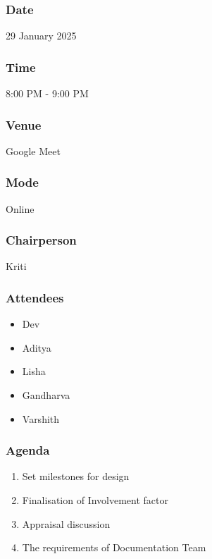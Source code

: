 \documentclass[12pt,a4paper]{article}
\begin{document}
\subsubsection*{Date}
29 January 2025

\subsubsection*{Time}
8:00 PM - 9:00 PM

\subsubsection*{Venue}
Google Meet

\subsubsection*{Mode}
Online

\subsubsection*{Chairperson}
Kriti

\subsubsection*{Attendees}
\begin{itemize}
    \item Dev
    \item Aditya
    \item Lisha
    \item Gandharva
    \item Varshith
\end{itemize}

\subsubsection*{Agenda}
\begin{enumerate}
    \item Set milestones for design
    \item Finalisation of Involvement factor
    \item Appraisal discussion
    \item The requirements of Documentation Team
\end{enumerate}
\end{document}
